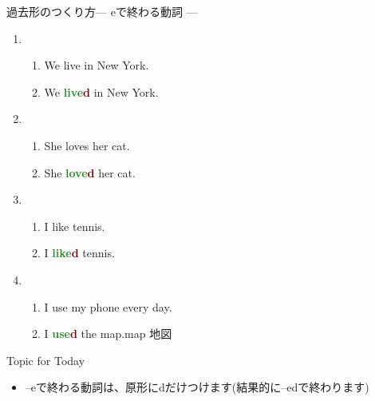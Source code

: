 \documentclass[aspectratio=169,xcolor={dvipsnames,table}]{beamer}
\newcommand{\myaudio}[1]{\href{#1}{\faVolumeUp}}
\begin{document}
\begin{frame}[plain]{過去形のつくり方--- eで終わる動詞 ---}
 
\begin{enumerate}
 \item \begin{enumerate}
	\item We live in New York.\pause
	\item We \textcolor{ForestGreen}{\bfseries live}\textcolor{Maroon}{\bfseries d} in New York.\pause
       \end{enumerate}
 \item \begin{enumerate}
	\item She loves her cat.\pause
	\item She  \textcolor{ForestGreen}{\bfseries love}\textcolor{Maroon}{\bfseries d} her cat.\pause
       \end{enumerate} \item \begin{enumerate}
	\item I like tennis.\pause
	\item I  \textcolor{ForestGreen}{\bfseries like}\textcolor{Maroon}{\bfseries d} tennis.\pause
       \end{enumerate}
 \item \begin{enumerate}
	\item I use my phone every day.\pause
	\item I  \textcolor{ForestGreen}{\bfseries use}\textcolor{Maroon}{\bfseries d} the map.\hfill{{{\scriptsize map  地図}}}\pause
       \end{enumerate}
\end{enumerate}

\begin{exampleblock}{Topic for Today}\small
\begin{itemize}[square]
 \item --eで終わる動詞は、原形にdだけつけます(結果的に--edで終わります)
\end{itemize}
\end{exampleblock}

\hfill\myaudio{./audio/025_past_do_05.mp3}

\end{frame}
\end{document}
